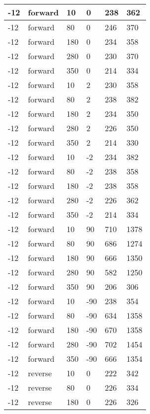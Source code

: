 \begin{table}
\begin{center}
\begin{tabular}{|l|l|l|l|l|l|}
			\hline
			-12 & forward & 10 & 0 & 238 & 362 \\
			\hline
			-12 & forward & 80 & 0 & 246 & 370 \\
			\hline
			-12 & forward & 180 & 0 & 234 & 358 \\
			\hline
			-12 & forward & 280 & 0 & 230 & 370 \\
			\hline
			-12 & forward & 350 & 0 & 214 & 334 \\
			\hline
			-12 & forward & 10 & 2 & 230 & 358 \\
			\hline
			-12 & forward & 80 & 2 & 238 & 382 \\
			\hline
			-12 & forward & 180 & 2 & 234 & 350 \\
			\hline
			-12 & forward & 280 & 2 & 226 & 350 \\
			\hline
			-12 & forward & 350 & 2 & 214 & 330 \\
			\hline
			-12 & forward & 10 & -2 & 234 & 382 \\
			\hline
			-12 & forward & 80 & -2 & 238 & 358 \\
			\hline
			-12 & forward & 180 & -2 & 238 & 358 \\
			\hline
			-12 & forward & 280 & -2 & 226 & 362 \\
			\hline
			-12 & forward & 350 & -2 & 214 & 334 \\
			\hline
			-12 & forward & 10 & 90 & 710 & 1378 \\
			\hline
			-12 & forward & 80 & 90 & 686 & 1274 \\
			\hline
			-12 & forward & 180 & 90 & 666 & 1350 \\
			\hline
			-12 & forward & 280 & 90 & 582 & 1250 \\
			\hline
			-12 & forward & 350 & 90 & 206 & 306 \\
			\hline
			-12 & forward & 10 & -90 & 238 & 354 \\
			\hline
			-12 & forward & 80 & -90 & 634 & 1358 \\
			\hline
			-12 & forward & 180 & -90 & 670 & 1358 \\
			\hline
			-12 & forward & 280 & -90 & 702 & 1454 \\
			\hline
			-12 & forward & 350 & -90 & 666 & 1354 \\
			\hline
			-12 & reverse & 10 & 0 & 222 & 342 \\
			\hline
			-12 & reverse & 80 & 0 & 226 & 334 \\
			\hline
			-12 & reverse & 180 & 0 & 226 & 326 \\
			\hline

\end{tabular}
\end{center}
\end{table}
